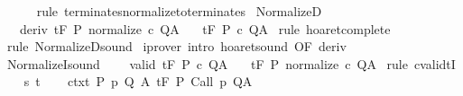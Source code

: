 \begin{isabellebody}
\ \ \ \ \isamarkupfalse%
\ {\isacharparenleft}rule\ terminates{\isacharunderscore}normalize{\isacharunderscore}to{\isacharunderscore}terminates{\isacharparenright}\isanewline
{}\isamarkupfalse%
%
\endisatagproof
{\isafoldproof}%
%
\isadelimproof
\isanewline
%
\endisadelimproof
\isanewline
{}\isamarkupfalse%
\ NormalizeD{\isacharcolon}\ \isanewline
\ \ \ deriv{\isacharcolon}\ {\isachardoublequoteopen}{\isasymGamma}{\isacharcomma}{\isasymTheta}{\isasymturnstile}\isactrlsub t\isactrlbsub {\isacharslash}F\isactrlesub \ P\ {\isacharparenleft}normalize\ c{\isacharparenright}\ Q{\isacharcomma}A{\isachardoublequoteclose}\isanewline
\ \ \ {\isachardoublequoteopen}{\isasymGamma}{\isacharcomma}{\isasymTheta}{\isasymturnstile}\isactrlsub t\isactrlbsub {\isacharslash}F\isactrlesub \ P\ c\ Q{\isacharcomma}A{\isachardoublequoteclose}\isanewline
%
\isadelimproof
%
\endisadelimproof
%
\isatagproof
{}\isamarkupfalse%
\ {\isacharparenleft}rule\ hoaret{\isacharunderscore}complete{\isacharprime}{\isacharparenright}\isanewline
{}\isamarkupfalse%
\ {\isacharparenleft}rule\ NormalizeD{\isacharunderscore}sound{\isacharparenright}\isanewline
{}\isamarkupfalse%
\ {\isacharparenleft}iprover\ intro{\isacharcolon}\ hoaret{\isacharunderscore}sound\ {\isacharbrackleft}OF\ deriv{\isacharbrackright}{\isacharparenright}\isanewline
{}\isamarkupfalse%
%
\endisatagproof
{\isafoldproof}%
%
\isadelimproof
\isanewline
%
\endisadelimproof
\isanewline
{}\isamarkupfalse%
\ NormalizeI{\isacharunderscore}sound{\isacharcolon}\ \isanewline
\ \ \ valid{\isacharcolon}\ {\isachardoublequoteopen}{\isasymGamma}{\isacharcomma}{\isasymTheta}{\isasymTurnstile}\isactrlsub t\isactrlbsub {\isacharslash}F\isactrlesub \ P\ c\ Q{\isacharcomma}A{\isachardoublequoteclose}\isanewline
\ \ \ {\isachardoublequoteopen}{\isasymGamma}{\isacharcomma}{\isasymTheta}{\isasymTurnstile}\isactrlsub t\isactrlbsub {\isacharslash}F\isactrlesub \ P\ {\isacharparenleft}normalize\ c{\isacharparenright}\ Q{\isacharcomma}A{\isachardoublequoteclose}\isanewline
%
\isadelimproof
%
\endisadelimproof
%
\isatagproof
{}\isamarkupfalse%
\ {\isacharparenleft}rule\ cvalidtI{\isacharparenright}\isanewline
\ \ \isamarkupfalse%
\ s\ t\isanewline
\ \ \isamarkupfalse%
\ ctxt{\isacharcolon}\ {\isachardoublequoteopen}{\isasymforall}{\isacharparenleft}P{\isacharcomma}\ p{\isacharcomma}\ Q{\isacharcomma}\ A{\isacharparenright}{\isasymin}{\isasymTheta}{\isachardot}\ {\isasymGamma}{\isasymTurnstile}\isactrlsub t\isactrlbsub {\isacharslash}F\isactrlesub \ P\ {\isacharparenleft}Call\ p{\isacharparenright}\ Q{\isacharcomma}A{\isachardoublequoteclose}\ \isanewline

\end{isabellebody}
